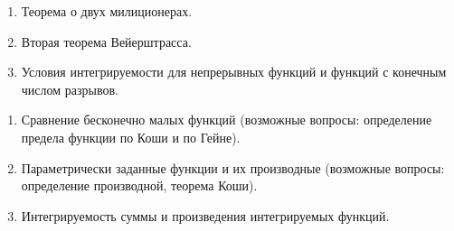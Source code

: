 \documentclass{article}
\newcounter{ticket}[subsection]
\newenvironment{ticket}[1][]{\item[Билет \ifthenelse{\equal{#1}{}}{}{\setcounter{ticket}{#1}}\theticket\refstepcounter{ticket}:]\phantom{}\begin{enumerate}}{\end{enumerate}}
\begin{document}
\begin{description}
\begin{ticket}
	\end{ticket}
	\begin{ticket}
		\item Теорема о двух милиционерах.
		\item Вторая теорема Вейерштрасса.
		\item Условия интегрируемости для непрерывных функций и функций с конечным числом разрывов.
	\end{ticket}
	\begin{ticket}
		\item Сравнение бесконечно малых функций (возможные вопросы: определение предела функции по Коши и по Гейне).
		\item Параметрически заданные функции и их производные (возможные вопросы: определение производной, теорема Коши).
		\item Интегрируемость суммы и произведения интегрируемых функций.
	\end{ticket}
\end{description}
\end{document}
